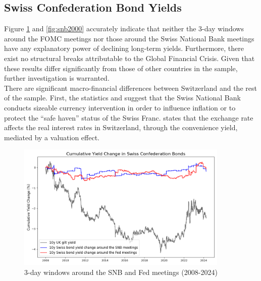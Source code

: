 
\subsection{Swiss Confederation Bond Yields}

Figure \ref{fig:snb2008} and \ref{fig:snb2000} accurately indicate that neither the 3-day windows around the FOMC meetings nor those around the Swiss National Bank meetings have any explanatory power of declining long-term yields. Furthermore, there exist no structural breaks attributable to the Global Financial Crisis. Given that these results differ significantly from those of other countries in the sample, further investigation is warranted. \\

There are significant macro-financial differences between Switzerland and the rest of the sample. First, the statistics and \citet{cwik2024fx} suggest that the Swiss National Bank conducts sizeable currency intervention in order to influence inflation or to protect the ``safe haven'' status of the Swiss Franc. \citet{bacchetta2022understanding} states that the exchange rate affects the real interest rates in Switzerland, through the convenience yield, mediated by a valuation effect.

\begin{figure}[!htbp]
    \centering
    \includegraphics[width=0.9\textwidth]{figures/2008_swiss_bonds_figure1a.png}
    \caption{3-day windows around the SNB and Fed meetings (2008-2024)}
    \label{fig:snb2008}
\end{figure}

